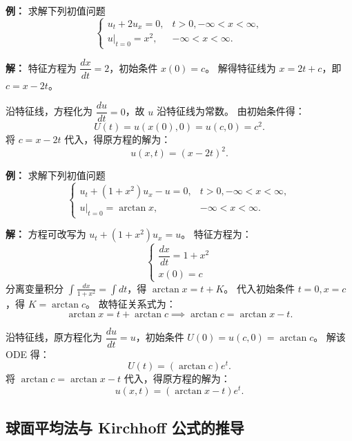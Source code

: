 \documentclass[12pt,a4paper]{ctexart}
\begin{document}
	
	\textbf{例：} 求解下列初值问题
	\begin{equation}
		\begin{cases}
			u_t + 2u_x = 0, & t > 0, -\infty < x < \infty, \\[6pt]
			u|_{t=0} = x^2, & -\infty < x < \infty.
		\end{cases}
	\end{equation}
	
	\textbf{解：}
	特征方程为 $\dfrac{dx}{dt} = 2$，初始条件 $x(0)=c$。
	解得特征线为 $x = 2t + c$，即 $c = x - 2t$。
	
	沿特征线，方程化为 $\dfrac{du}{dt} = 0$，故 $u$ 沿特征线为常数。
	由初始条件得：
	\[ U(t) = u(x(0), 0) = u(c, 0) = c^2. \]
	将 $c = x - 2t$ 代入，得原方程的解为：
	\begin{equation}
		u(x,t) = (x - 2t)^2.
	\end{equation}
	
	\vspace{1em} %
	
	\textbf{例：} 求解下列初值问题
	\begin{equation}
		\begin{cases}
			u_t + (1+x^2)u_x - u = 0, & t > 0, -\infty < x < \infty, \\[6pt]
			u|_{t=0} = \arctan x, & -\infty < x < \infty.
		\end{cases}
	\end{equation}
	
	\textbf{解：}
	方程可改写为 $u_t + (1+x^2)u_x = u$。
	特征方程为：
	\begin{equation}
		\begin{cases}
			\dfrac{dx}{dt} = 1 + x^2 \\[6pt]
			x(0) = c
		\end{cases}
	\end{equation}
	分离变量积分 $\displaystyle\int \frac{dx}{1+x^2} = \int dt$，得 $\arctan x = t + K$。
	代入初始条件 $t=0, x=c$，得 $K = \arctan c$。
	故特征关系式为：
	\[ \arctan x = t + \arctan c \implies \arctan c = \arctan x - t. \]
	
	沿特征线，原方程化为 $\dfrac{du}{dt} = u$，初始条件 $U(0) = u(c,0) = \arctan c$。
	解该 ODE 得：
	\[ U(t) = (\arctan c) e^t. \]
	将 $\arctan c = \arctan x - t$ 代入，得原方程的解为：
	\begin{equation}
		u(x,t) = (\arctan x - t)e^t.
	\end{equation}
	
	\subsection{球面平均法与 Kirchhoff 公式的推导}
\end{document}
